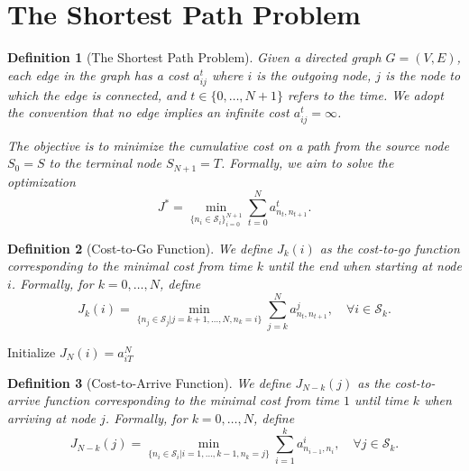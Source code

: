 \documentclass[a4 paper]{article}
\numberwithin{equation}{section}
\theoremstyle{boldStyle}
\theoremstyle{boldBlueStyle}
\theoremstyle{boldPurpleStyle}
\theoremstyle{boldRedStyle}
\newtheorem{definition}{Definition}[section]
\theoremstyle{boldGreenStyle}
\begin{document}
\section{The Shortest Path Problem}

\begin{definition}[The Shortest Path Problem]
  Given a directed graph \( G = (V, E) \), each edge in the graph has a cost \( a^t_{ij} \) where 
  \( i \) is the outgoing node, \( j \) is the node to which the edge is connected, 
  and \( t \in \{0, \ldots, N+1\} \) refers to the time. We adopt the convention that no edge implies 
  an infinite cost \( a^t_{ij} = \infty \).

  The objective is to minimize the cumulative cost on a path from the source node \( S_0 = S \) to the 
  terminal node \( S_{N+1} = T \). Formally, we aim to solve the optimization
  \begin{equation}
      J^* = \min_{\{n_i \in \mathcal{S}_i\}_{i=0}^{N+1}} \sum_{t=0}^{N} a^t_{n_t, n_{t+1}}.
  \end{equation}
\end{definition}

\begin{definition}[Cost-to-Go Function]
  We define \( J_k(i) \) as the cost-to-go function corresponding to the minimal cost from time \( k \) 
  until the end when starting at node \( i \). Formally, for \( k = 0, \ldots, N \), define
  \begin{equation}
      J_k(i) = \min_{\{n_j \in \mathcal{S}_j | j=k+1,\ldots,N,n_k=i\}} \sum_{j=k}^{N} a^j_{n_t, n_{t+1}}, 
      \quad \forall i \in \mathcal{S}_k.
  \end{equation}
\end{definition}


\begin{algorithm}[H]
    \SetNoFillComment
    \SetAlgoLined
    Initialize \( J_N(i) = a^N_{iT} \) \;
    \caption{} \label{algo:dp_solution_shortest_path}
\end{algorithm}


\begin{definition}[Cost-to-Arrive Function]
  We define \( J_{N-k}(j) \) as the cost-to-arrive function corresponding to the minimal cost from time \( 1 \) 
  until time \( k \) when arriving at node \( j \). Formally, for \( k = 0, \ldots, N \), define
  \begin{equation}
      J_{N-k}(j) = \min_{\{n_i \in \mathcal{S}_i | i=1,\ldots,k-1,n_k=j\}} \sum_{i=1}^{k} a^i_{n_{i-1}, n_i}, 
      \quad \forall j \in \mathcal{S}_k.
  \end{equation}
\end{definition}
\end{document}
